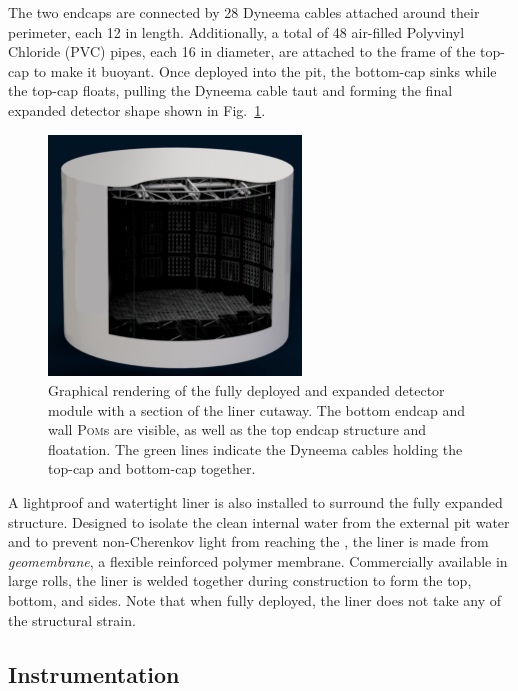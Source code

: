 The two endcaps are connected by 28 Dyneema cables attached around their perimeter, each
\unit{12}{} in length. Additionally, a total of 48 air-filled Polyvinyl Chloride (PVC)
pipes, each \unit{16}{} in diameter, are attached to the frame of the top-cap to make
it buoyant. Once deployed into the pit, the bottom-cap sinks while the top-cap floats, pulling the
Dyneema cable taut and forming the final expanded detector shape shown in
Fig.~\ref{fig:chips_render}.

\begin{figure} %
    \includegraphics[width=0.6\textwidth]{diagrams/4-chips/chips_render.pdf}
    \caption[Graphical rendering of the \chipsfive detector]
    {Graphical rendering of the fully deployed and expanded \chipsfive detector module with a
        section of the liner cutaway. The bottom endcap and wall \textsc{Pom}s are visible, as
        well as the top endcap structure and floatation. The green lines indicate the Dyneema
        cables holding the top-cap and bottom-cap together.}
    \label{fig:chips_render}
\end{figure}

A lightproof and watertight liner is also installed to surround the fully expanded structure.
Designed to isolate the clean internal water from the external pit water and to prevent
non-Cherenkov light from reaching the \PMTs, the liner is made from \emph{geomembrane}, a flexible
reinforced polymer membrane. Commercially available in large rolls, the liner is welded together
during construction to form the top, bottom, and sides. Note that when fully deployed, the liner
does not take any of the structural strain.

\subsection{Instrumentation} %
\label{sec:chips_detector_instrumentation} %

